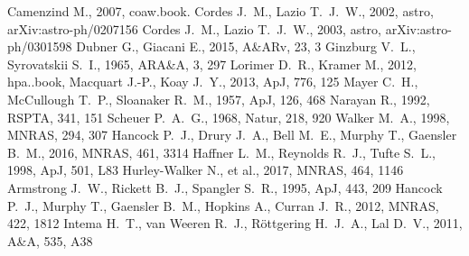 \documentclass[a4paper, 10pt]{article}
\begin{document}

\begin{thebibliography}{99}
 Camenzind M., 2007, coaw.book.
 Cordes J.~M., Lazio T.~J.~W., 2002, astro, arXiv:astro-ph/0207156 
 Cordes J.~M., Lazio T.~J.~W., 2003, astro, arXiv:astro-ph/0301598 
 Dubner G., Giacani E., 2015, A\&ARv, 23, 3 
 Ginzburg V.~L., Syrovatskii S.~I., 1965, ARA\&A, 3, 297 
 Lorimer D.~R., Kramer M., 2012, hpa..book,
 Macquart J.-P., Koay J.~Y., 2013, ApJ, 776, 125 
 Mayer C.~H., McCullough T.~P., Sloanaker R.~M., 1957, ApJ, 126, 468 
 Narayan R., 1992, RSPTA, 341, 151 
 Scheuer P.~A.~G., 1968, Natur, 218, 920 
 Walker M.~A., 1998, MNRAS, 294, 307 
 Hancock P.~J., Drury J.~A., Bell M.~E., Murphy T., Gaensler B.~M., 2016, MNRAS, 461, 3314 
 Haffner L.~M., Reynolds R.~J., Tufte S.~L., 1998, ApJ, 501, L83 
 Hurley-Walker N., et al., 2017, MNRAS, 464, 1146 
 Armstrong J.~W., Rickett B.~J., Spangler S.~R., 1995, ApJ, 443, 209 
 Hancock P.~J., Murphy T., Gaensler B.~M., Hopkins A., Curran J.~R., 2012, MNRAS, 422, 1812 
 Intema H.~T., van Weeren R.~J., R{\"o}ttgering H.~J.~A., Lal D.~V., 2011, A\&A, 535, A38 
\end{thebibliography}


\bsp	%
\label{lastpage}
\end{document}
